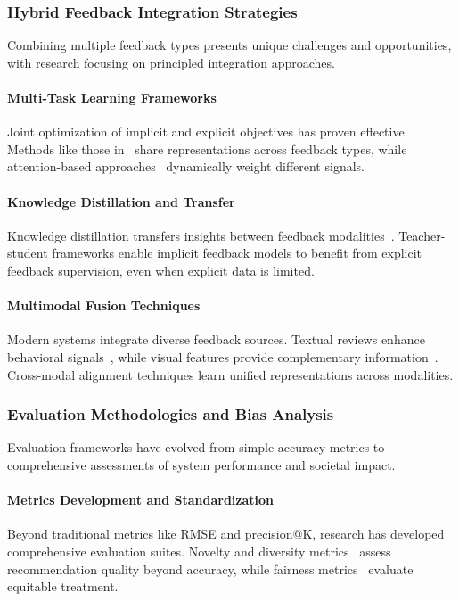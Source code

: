 \subsubsection{Hybrid Feedback Integration Strategies}

Combining multiple feedback types presents unique challenges and opportunities, with research focusing on principled integration approaches.

\paragraph{Multi-Task Learning Frameworks}
Joint optimization of implicit and explicit objectives has proven effective. Methods like those in~\cite{ma2011learning, zhao2015improving} share representations across feedback types, while attention-based approaches~\cite{chen2017attentive, liu2018stamp} dynamically weight different signals.

\paragraph{Knowledge Distillation and Transfer}
Knowledge distillation transfers insights between feedback modalities~\cite{zhang2020knowledge}. Teacher-student frameworks enable implicit feedback models to benefit from explicit feedback supervision, even when explicit data is limited.

\paragraph{Multimodal Fusion Techniques}
Modern systems integrate diverse feedback sources. Textual reviews enhance behavioral signals~\cite{liu2022multimodal}, while visual features provide complementary information~\cite{wei2021contrastive}. Cross-modal alignment techniques learn unified representations across modalities.

\subsubsection{Evaluation Methodologies and Bias Analysis}

Evaluation frameworks have evolved from simple accuracy metrics to comprehensive assessments of system performance and societal impact.

\paragraph{Metrics Development and Standardization}
Beyond traditional metrics like RMSE and precision@K, research has developed comprehensive evaluation suites. Novelty and diversity metrics~\cite{castells2011novelty} assess recommendation quality beyond accuracy, while fairness metrics~\cite{ge2020understanding} evaluate equitable treatment.

